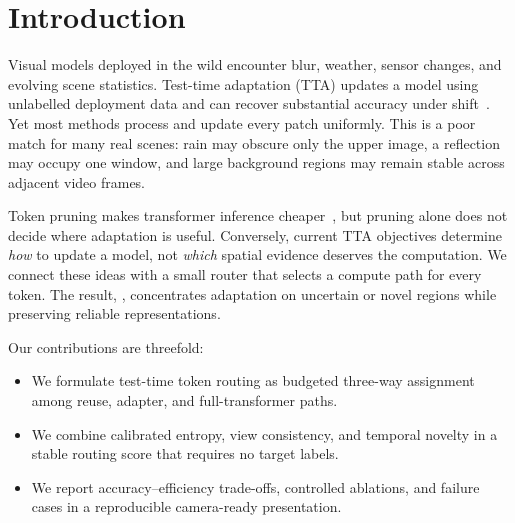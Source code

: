 \section{Introduction}
\label{sec:intro}

Visual models deployed in the wild encounter blur, weather, sensor changes,
and evolving scene statistics.  Test-time adaptation (TTA) updates a model
using unlabelled deployment data and can recover substantial accuracy under
shift~\citep{wang2021tent,niu2022efficient}.  Yet most methods process and
update every patch uniformly.  This is a poor match for many real scenes: rain
may obscure only the upper image, a reflection may occupy one window, and
large background regions may remain stable across adjacent video frames.

Token pruning makes transformer inference cheaper~\citep{rao2021dynamicvit,
bolya2023tome}, but pruning alone does not decide where adaptation is useful.
Conversely, current TTA objectives determine \emph{how} to update a model, not
\emph{which} spatial evidence deserves the computation.  We connect these
ideas with a small router that selects a compute path for every token.  The
result, \method, concentrates adaptation on uncertain or novel regions while
preserving reliable representations.

Our contributions are threefold:
\begin{itemize}
  \item We formulate test-time token routing as budgeted three-way assignment
        among reuse, adapter, and full-transformer paths.
  \item We combine calibrated entropy, view consistency, and temporal novelty
        in a stable routing score that requires no target labels.
  \item We report accuracy--efficiency trade-offs, controlled ablations, and
        failure cases in a reproducible camera-ready presentation.
\end{itemize}


